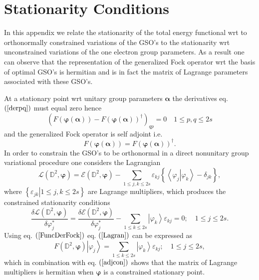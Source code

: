 \documentclass[aps,preprint]{revtex4}%
\begin{document}
\section{Stationarity Conditions\label{StatCon}}

In this appendix we relate the stationarity of the total energy functional wrt
to orthonormally constrained variations of the GSO's to the stationarity wrt
unconstrained variations of the one electron group parameters. As a result one
can observe that the representation of the generalized Fock operator wrt the
basis of optimal GSO's is hermitian and is in fact the matrix of Lagrange
parameters associated with these GSO's.

At a stationary point wrt unitary group parameters $\bm{\alpha}$ the
derivatives eq. $\left(  \ref{derpq}\right)  $ must equal zero hence
\begin{equation}
\left(  F\left(  \bm{\varphi}\left(  \bm{\alpha}\right)  \right)  -F\left(
\bm{\varphi}\left(  \bm{\alpha}\right)  \right)  ^{\dagger}\right)
_{qp}=0\quad1\leq p,q\leq2s
\end{equation}
and the generalized Fock operator is self adjoint i.e.
\begin{equation}
F\left(  \bm{\varphi}\left(  \bm{\alpha}\right)  \right)  =F\left(
\bm{\varphi}\left(  \bm{\alpha}\right)  \right)  ^{\dagger}. \label{adjcon}%
\end{equation}
In order to constrain the GSO's to be orthonormal in a direct nonunitary group
variational procedure one considers the Lagrangian
\begin{equation}
\mathcal{L}\left(  \mathbb{D}^{2},\bm{\varphi}\right)  =\mathcal{E}\left(
\mathbb{D}^{2},\bm{\varphi}\right)  -\sum_{1\leq j,k\leq2s}\varepsilon
_{kj}\left\{  \left\langle \left.  \varphi_{j}\right\vert \varphi
_{k}\right\rangle -\delta_{jk}\right\}  ,
\end{equation}
where $\left\{  \left.  \varepsilon_{jk}\right\vert 1\leq j,k\leq2s\right\}  $
are Lagrange multipliers, which produces the constrained stationarity
conditions
\begin{equation}
\frac{\delta\mathcal{L}\left(  \mathbb{D}^{2},\bm{\varphi}\right)  }%
{\delta\varphi_{j}^{\ast}}=\frac{\delta\mathcal{E}\left(  \mathbb{D}%
^{2},\bm{\varphi}\right)  }{\delta\varphi_{j}^{\ast}}-\sum_{1\leq k\leq
2s}\left\vert \varphi_{k}\right\rangle \varepsilon_{kj}=0;\quad1\leq j\leq2s.
\label{Lagran}%
\end{equation}
Using eq. $\left(  \ref{FuncDerFock}\right)  $ eq. $\left(  \ref{Lagran}%
\right)  $ can be expressed as
\begin{equation}
F\left(  \mathbb{D}^{2},\bm{\varphi}\right)  \left\vert \varphi_{j}%
\right\rangle =\sum_{1\leq k\leq2s}\left\vert \varphi_{k}\right\rangle
\varepsilon_{kj};\quad1\leq j\leq2s,
\end{equation}
which in combination with eq. $\left(  \ref{adjcon}\right)  $ shows that the
matrix of Lagrange multipliers is hermitian when $\bm{\varphi}$ is a
constrained stationary point.
\end{document}
